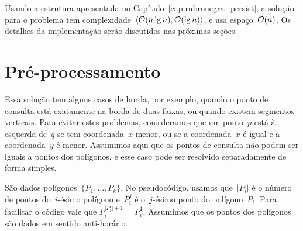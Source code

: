 \documentclass[main.tex]{subfiles}
\begin{document}
Usando a estrutura apresentada no Capítulo~\ref{cap:rubronegra_persist}, a solução para o problema tem complexidade~$\langle\mathcal{O}(n \lg n), \mathcal{O}(\lg n)\rangle$, e usa espaço~$\mathcal{O}(n)$. Os detalhes da implementação serão discutidos nas próximas seções.


\section{Pré-processamento}

Essa solução tem alguns casos de borda, por exemplo, quando o ponto de consulta está exatamente na borda de duas faixas, ou quando existem segmentos verticais. Para evitar estes problemas, consideramos que um ponto~$p$ está à esquerda de~$q$ se tem coordenada~$x$ menor, ou se a coordenada~$x$ é igual e a coordenada~$y$ é menor. Assumimos aqui que os pontos de consulta não podem ser iguais a pontos dos polígonos, e esse caso pode ser resolvido separadamente de forma simples.

\providecommand{\from}{\V{from}}
\providecommand{\tto}{\V{to}}
\providecommand{\topp}{\V{top}}
\providecommand{\seg}{\V{seg}}
\providecommand{\add}{\V{add}}
\providecommand{\events}{\V{events}}
\providecommand{\rbt}{\V{rbt}}
\providecommand{\slabs}{\V{slabs}}
\providecommand{\current}{\V{current}}
\providecommand{\polygon}{\V{polygon}}

São dados polígonos~$\{P_1, \ldots, P_k\}$. No pseudocódigo, usamos que~$|P_i|$ é o número de pontos do~\mbox{$i$-ésimo} polígono e~$P_i^j$ é o~$j$-ésimo ponto do polígono~$P_i$. Para facilitar o código vale que ${P_i^{|P_i|+1} = P_i^1}$. Assumimos que os pontos dos polígonos são dados em sentido anti-horário.
\end{document}
